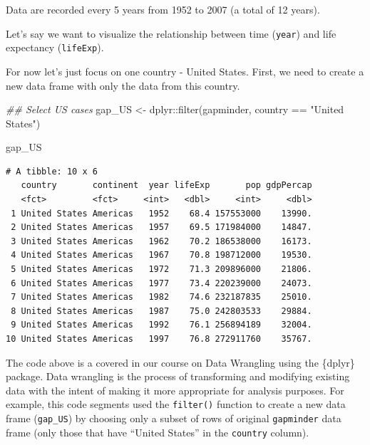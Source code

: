 \documentclass[
  letterpaper,
  DIV=11,
  numbers=noendperiod]{scrreprt}
\newenvironment{Shaded}{\begin{snugshade}}{\end{snugshade}}
\newcommand{\DocumentationTok}[1]{\textcolor[rgb]{0.37,0.37,0.37}{\textit{#1}}}
\newcommand{\FunctionTok}[1]{\textcolor[rgb]{0.28,0.35,0.67}{#1}}
\newcommand{\NormalTok}[1]{\textcolor[rgb]{0.00,0.23,0.31}{#1}}
\newcommand{\OtherTok}[1]{\textcolor[rgb]{0.00,0.23,0.31}{#1}}
\newcommand{\SpecialCharTok}[1]{\textcolor[rgb]{0.37,0.37,0.37}{#1}}
\newcommand{\StringTok}[1]{\textcolor[rgb]{0.13,0.47,0.30}{#1}}
\begin{document}
Data are recorded every 5 years from 1952 to 2007 (a total of 12 years).

Let's say we want to visualize the relationship between time
(\texttt{year}) and life expectancy (\texttt{lifeExp}).

For now let's just focus on one country - United States. First, we need
to create a new data frame with only the data from this country.

\begin{Shaded}
\begin{Highlighting}[]
\DocumentationTok{\#\# Select US cases}
\NormalTok{gap\_US }\OtherTok{\textless{}{-}}\NormalTok{ dplyr}\SpecialCharTok{::}\FunctionTok{filter}\NormalTok{(gapminder,}
\NormalTok{                        country }\SpecialCharTok{==} \StringTok{"United States"}\NormalTok{)}

\NormalTok{gap\_US}
\end{Highlighting}
\end{Shaded}

\begin{verbatim}
# A tibble: 10 x 6
   country       continent  year lifeExp       pop gdpPercap
   <fct>         <fct>     <int>   <dbl>     <int>     <dbl>
 1 United States Americas   1952    68.4 157553000    13990.
 2 United States Americas   1957    69.5 171984000    14847.
 3 United States Americas   1962    70.2 186538000    16173.
 4 United States Americas   1967    70.8 198712000    19530.
 5 United States Americas   1972    71.3 209896000    21806.
 6 United States Americas   1977    73.4 220239000    24073.
 7 United States Americas   1982    74.6 232187835    25010.
 8 United States Americas   1987    75.0 242803533    29884.
 9 United States Americas   1992    76.1 256894189    32004.
10 United States Americas   1997    76.8 272911760    35767.
\end{verbatim}

\begin{tcolorbox}[enhanced jigsaw, title=\textcolor{quarto-callout-note-color}{\faInfo}\hspace{0.5em}{Reminder}, colbacktitle=quarto-callout-note-color!10!white, leftrule=.75mm, arc=.35mm, opacityback=0, bottomrule=.15mm, rightrule=.15mm, toptitle=1mm, breakable, toprule=.15mm, colback=white, coltitle=black, colframe=quarto-callout-note-color-frame, bottomtitle=1mm, titlerule=0mm, left=2mm, opacitybacktitle=0.6]

The code above is a covered in our course on Data Wrangling using the
\{dplyr\} package. Data wrangling is the process of transforming and
modifying existing data with the intent of making it more appropriate
for analysis purposes. For example, this code segments used the
\texttt{filter()} function to create a new data frame (\texttt{gap\_US})
by choosing only a subset of rows of original \texttt{gapminder} data
frame (only those that have ``United States'' in the \texttt{country}
column).

\end{tcolorbox}
\end{document}
